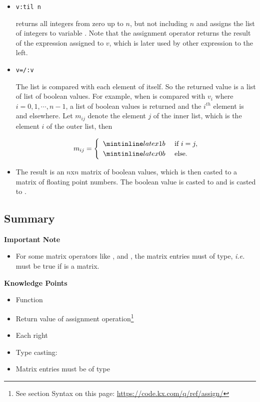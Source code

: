 \begin{itemize}
\item \begin{verbatim}
v:til n
\end{verbatim}
 returns all integers from zero up to $n$, but not including $n$ and assigns the list of integers to variable . Note that the assignment operator returns the result of the expression assigned to $v$, which is later used by other expression to the left.

\item \begin{verbatim}
v=/:v
\end{verbatim}
The list  is compared with each element of itself. So the returned value is a list of list of boolean values. For example, when  is compared with $v_i$ where $i = 0, 1, \cdots, n-1$, a list of boolean values is returned and the $i^{th}$ element is  and  elsewhere. Let $m_{ij}$ denote the element $j$ of the inner list, which is the element $i$ of the outer list, then 

$$
m_{ij} = 
\begin{cases}
\enspace \q{1b} & \text{ if } i=j, \\
\enspace \q{0b} & \text{ else. }
\end{cases}
$$

\item The result is an $n$x$n$ matrix of boolean values, which is then casted to a matrix of floating point numbers. The boolean value  is casted to  and  is casted to .
\end{itemize}


\subsection{Summary}

\begin{importantblock}
\textbf{Important Note}
\begin{itemize}
\item For some matrix operators like ,  and \q{$}, the matrix entries must of  type, \emph{i.e.}  must be true if  is a matrix.
\end{itemize}
\end{importantblock}

\begin{noteblock}
\textbf{Knowledge Points}
\begin{itemize}
\item Function \href{https://code.kx.com/q/ref/til/}{} 
\item Return value of assignment operation\footnote{See section Syntax on this page: \url{https://code.kx.com/q/ref/assign/}}
\item Each right \href{https://code.kx.com/q/ref/maps/#each-left-and-each-right}{\q{/:}}
\item Type casting: \href{https://code.kx.com/q/ref/cast/}{\q{$}}
\item Matrix entries must be of  type
\end{itemize}
\end{noteblock}

\clearpage
